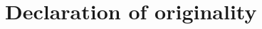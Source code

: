 \documentclass[12pt]{report}
\begin{document}



\chapter*{Declaration of originality}


\tableofcontents
\end{document}
